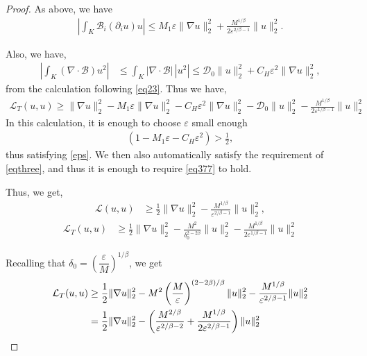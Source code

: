 \documentclass[10pt,a4paper]{amsart}
\begin{document}
\begin{proof}
As above, we have
\begin{align}
\left|\int_K \mathcal{B}_i(\partial_i u)u\right|
\leq M_1\varepsilon\|\nabla u\|_2^2 + \frac{M^{1/\beta}}{2\varepsilon^{2/\beta -1}}\|u\|_2^2.
\end{align}

Also, we have,
\begin{align}
\left|\int_K (\nabla\cdot\mathcal{B})u^2\right|
&\leq \int_K |\nabla\cdot\mathcal{B}|\,|u^2|
\leq \mathcal{D}_0\|u\|_2^2 + C_H \varepsilon^2\|\nabla u\|_2^2,
\end{align}
from the calculation following \cref{eq23}. Thus we have,
\begin{align}
\mathcal{L}_T(u,u) \geq \|\nabla u\|_2^2 - M_1\varepsilon\|\nabla u\|_2^2
- C_H \varepsilon^2\|\nabla u\|_2^2 - \mathcal{D}_0\|u\|_2^2
- \frac{M^{1/\beta}}{2\varepsilon^{1/\beta -1}}\|u\|_2^2
\end{align}
In this calculation, it is enough to choose $\varepsilon$ small enough 
\begin{align}\label{eq377}
(1 - M_1\varepsilon - C_H \varepsilon^2) > \frac{1}{2},
\end{align} 
thus satisfying \cref{eps}. We then also automatically satisfy the requirement of \cref{eqthree}, and thus it is enough to require \cref{eq377} to hold.


Thus, we get,
\begin{align}
\mathcal{L}(u,u) &\geq \frac{1}{2}\|\nabla u\|_2^2 - \frac{M^{1/\beta}}{\varepsilon^{2/\beta -1}}\|u\|_2^2,
\end{align}
\begin{align}
\mathcal{L}_T(u,u) &\geq \frac{1}{2}\|\nabla u\|_2^2 - \frac{M^2}{\delta_0^{2-2\beta}}\|u\|_2^2 - \frac{M^{1/\beta}}{2\varepsilon^{1/\beta -1}}\|u\|_2^2
\end{align}

Recalling that $\delta_0 = \left(\dfrac{\varepsilon}{M}\right)^{1/\beta}$, we get
\begin{align}
\mathcal{L}_T(u,u) &\geq \frac{1}{2}\|\nabla u\|_2^2
- M^2 \left(\frac{M}{\varepsilon}\right)^{(2-2\beta)/\beta} \|u\|_2^2
- \frac{M^{1/\beta}}{\varepsilon^{2/\beta-1}}\|u\|_2^2 \notag \\
&= \frac{1}{2}\|\nabla u\|_2^2
- \left(\frac{M^{2/\beta}}{\varepsilon^{2/\beta-2}} + \frac{M^{1/\beta}}{2\varepsilon^{2/\beta-1}}\right)\|u\|_2^2
\end{align}


\end{proof}
\end{document}
